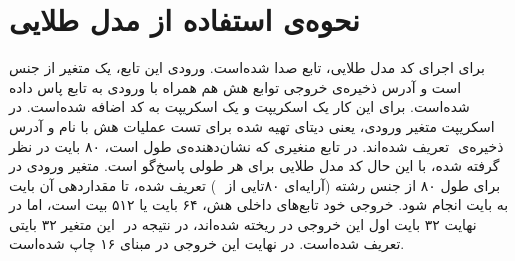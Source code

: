 \section{\textbf{نحوه‌ی استفاده از مدل طلایی}}
برای اجرای کد مدل طلایی، تابع  صدا شده‌است. ورودی این تابع، یک متغیر از جنس   است و آدرس ذخیره‌ی ‌خروجی توابع هش هم همراه با ورودی به تابع پاس داده شده‌است. برای این کار یک اسکریپت \href{https://github.com/VahidZee/SkeinHashingHDL/blob/master/SourceCode/C/main.c}{}  و یک اسکریپت \href{https://github.com/VahidZee/SkeinHashingHDL/blob/master/SourceCode/C/skeinhash.h}{}  به کد اضافه شده‌است. در اسکریپت  متغیر ورودی، یعنی دیتای ‌تهیه شده برای تست عملیات هش  با نام و آدرس ذخیره‌ی ‌ تعریف شده‌اند. در تابع  منغیری که نشان‌دهنده‌ی طول  است،  ۸۰ بایت در نظر گرفته شده، با این حال کد مدل طلایی برای هر طولی پاسخ‌گو است. متغیر ‌ورودی در   برای طول ۸۰ از جنس رشته (‌آرایه‌ای ۸۰تایی از ‌ ) تعریف شده‌‌، تا مقداردهی آن بایت به بایت انجام شود. خروجی خود تابع‌های داخلی هش، ۶۴ بایت یا ۵۱۲ بیت است، اما در نهایت ۳۲ بایت اول این خروجی در  ریخته شده‌اند، در نتیجه در ‌ این متغیر ۳۲ بایتی تعریف شده‌است. در نهایت این خروجی در مبنای ۱۶ چاپ شده‌است.